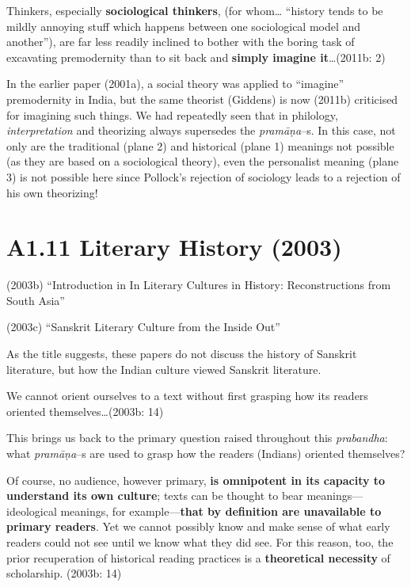 \begin{myquote}
Thinkers, especially \textbf{sociological thinkers}, (for whom… “history tends to be mildly annoying stuff which happens between one sociological model and another”), are far less readily inclined to bother with the boring task of excavating premodernity than to sit back and \textbf{simply imagine it}…(2011b: 2)
\end{myquote}

In the earlier paper (2001a), a social theory was applied to “imagine” premodernity in India, but the same theorist (Giddens) is now (2011b) criticised for imagining such things. We had repeatedly seen that in philology, \textit{interpretation} and theorizing always supersedes the \textit{pramāṇa}–s. In this case, not only are the traditional (plane 2) and historical (plane 1) meanings not possible (as they are based on a sociological theory), even the personalist meaning (plane 3) is not possible here since Pollock’s rejection of sociology leads to a rejection of his own theorizing!

\vspace {-.4cm}

\section*{A1.11 Literary History (2003)}

(2003b) “Introduction in In Literary Cultures in History: Reconstructions from South Asia”

(2003c) “Sanskrit Literary Culture from the Inside Out”

As the title suggests, these papers do not discuss the history of Sanskrit literature, but how the Indian culture viewed Sanskrit literature.

\begin{myquote}
We cannot orient ourselves to a text without ﬁrst grasping how its readers oriented themselves…(2003b: 14)
\end{myquote}

This brings us back to the primary question raised throughout this \textit{prabandha}: what \textit{pramāṇa}–s are used to grasp how the readers (Indians) oriented themselves?

\begin{myquote}
Of course, no audience, however primary, \textbf{is omnipotent in its capacity to understand its own culture}; texts can be thought to bear meanings—ideological meanings, for example—\textbf{that by deﬁnition are unavailable to primary readers}. Yet we cannot possibly know and make sense of what early readers could not see until we know what they did see. For this reason, too, the prior recuperation of historical reading practices is a \textbf{theoretical necessity} of scholarship. (2003b: 14)
\end{myquote}

